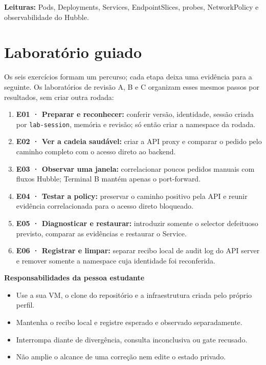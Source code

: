 \documentclass[12pt,openany,oneside,a4paper,chapter=TITLE,english,brazil]{abntex2}
\providecommand{\tightlist}{\setlength{\itemsep}{0pt}\setlength{\parskip}{0pt}}
\begin{document}
\textbf{Leituras:} Pods, Deployments, Services, EndpointSlices, probes, NetworkPolicy e observabilidade do Hubble.

\chapter*{Laboratório guiado}

Os seis exercícios formam um percurso; cada etapa deixa uma evidência para a seguinte. Os laboratórios de revisão A, B e C organizam esses mesmos passos por resultados, sem criar outra rodada:

\begin{enumerate}
\def\labelenumi{\arabic{enumi}.}
\tightlist
\item
  \textbf{E01 · Preparar e reconhecer:} conferir versão, identidade, sessão criada por \texttt{lab-{}\allowbreak{}session}, memória e revisão; só então criar a namespace da rodada.
\item
  \textbf{E02 · Ver a cadeia saudável:} criar a API proxy e comparar o pedido pelo caminho completo com o acesso direto ao backend.
\item
  \textbf{E03 · Observar uma janela:} correlacionar poucos pedidos manuais com fluxos Hubble; Terminal B mantém apenas o port-forward.
\item
  \textbf{E04 · Testar a policy:} preservar o caminho positivo pela API e reunir evidência correlacionada para o acesso direto bloqueado.
\item
  \textbf{E05 · Diagnosticar e restaurar:} introduzir somente o selector defeituoso previsto, comparar as evidências e restaurar o Service.
\item
  \textbf{E06 · Registrar e limpar:} separar recibo local de audit log do API server e remover somente a namespace cuja identidade foi reconferida.
\end{enumerate}

\textbf{Responsabilidades da pessoa estudante}

\begin{itemize}
\tightlist
\item
  Use a sua VM, o clone do repositório e a infraestrutura criada pelo próprio perfil.
\item
  Mantenha o recibo local e registre esperado e observado separadamente.
\item
  Interrompa diante de divergência, consulta inconclusiva ou gate recusado.
\item
  Não amplie o alcance de uma correção nem edite o estado privado.
\end{itemize}
\end{document}
